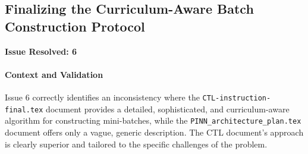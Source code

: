 \subsection{Finalizing the Curriculum-Aware Batch Construction Protocol}
\textbf{Issue Resolved: 6}
\paragraph{Context and Validation}
Issue 6 correctly identifies an inconsistency where the \texttt{CTL-instruction-\allowbreak final.tex} document provides a detailed, sophisticated, and curriculum-aware algorithm for constructing mini-batches, while the \texttt{PINN\_\allowbreak architecture\_\allowbreak plan.tex} document offers only a vague, generic description. The CTL document's approach is clearly superior and tailored to the specific challenges of the problem.

